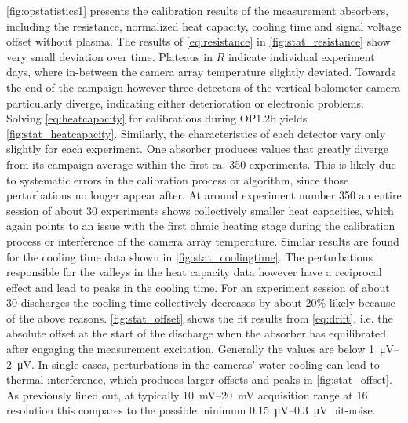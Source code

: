             \autoref{fig:opstatistics1} presents the calibration results of the measurement absorbers, including the resistance, normalized heat capacity, cooling time and signal voltage offset without plasma. The results of \cref{eq:resistance} in \cref{fig:stat_resistance} show very small deviation over time. Plateaus in $R$ indicate individual experiment days, where in-between the camera array temperature slightly deviated. Towards the end of the campaign however three detectors of the vertical bolometer camera particularly diverge, indicating either deterioration or electronic problems. Solving \cref{eq:heatcapacity} for calibrations during OP1.2b yields \cref{fig:stat_heatcapacity}. Similarly, the characteristics of each detector vary only slightly for each experiment. One absorber produces values that greatly diverge from its campaign average within the first ca. 350 experiments. This is likely due to systematic errors in the calibration process or algorithm, since those perturbations no longer appear after. At around experiment number 350 an entire session of about 30 experiments shows collectively smaller heat capacities, which again points to an issue with the first ohmic heating stage during the calibration process or interference of the camera array temperature. Similar results are found for the cooling time data shown in \cref{fig:stat_coolingtime}. The perturbations responsible for the valleys in the heat capacity data however have a reciprocal effect and lead to peaks in the cooling time. For an experiment session of about 30 discharges the cooling time collectively decreases by about 20\% likely because of the above reasons. \cref{fig:stat_offset} shows the fit results from \cref{eq:drift}, i.e. the absolute offset at the start of the discharge when the absorber has equilibrated after engaging the measurement excitation. Generally the values are below \SIrange{1}{2}{\micro\volt}. In single cases, perturbations in the cameras' water cooling can lead to thermal interference, which produces larger offsets and peaks in \cref{fig:stat_offset}. As previously lined out, at typically \SIrange{10}{20}{\milli\volt} acquisition range at \SI{16}{\bit} resolution this compares to the possible minimum \SIrange{0.15}{0.3}{\micro\volt} bit-noise.\\%
%

